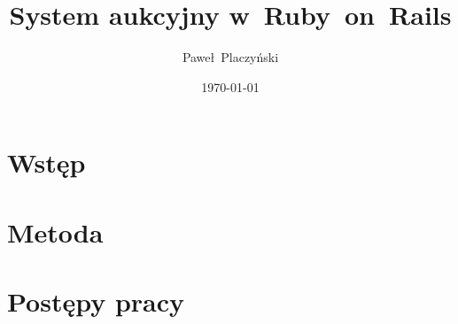 \documentclass[12pt]{report}
\author{Paweł~Placzyński}
\title{System aukcyjny w~Ruby~on~Rails}
\date{\today}
\begin{document}
\maketitle

\tableofcontents

\chapter{Wstęp}





%



%

\chapter{Metoda}









\chapter{Postępy pracy}

%





\end{document}
